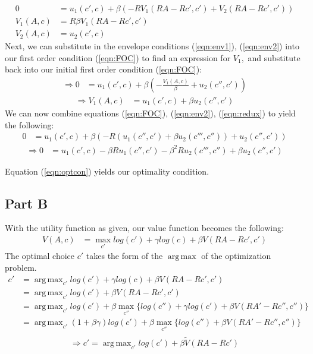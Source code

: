\documentclass[11pt]{article} %
\DeclareMathOperator*{\argmax}{arg\,max}
\begin{document}
\begin{align}
0&= u_1(c',c) + \beta (-RV_1(RA-Rc',c') + V_2(RA-Rc',c')) \label{eqn:FOC} \\
V_1(A,c) &= R\beta V_1(RA-Rc',c') \label{eqn:env1} \\
V_2(A,c) &= u_2(c',c) \label{eqn:env2}
\end{align}
Next, we can substitute in the envelope conditions (\ref{eqn:env1}), (\ref{eqn:env2}) into our first order condition (\ref{eqn:FOC}) to find an expression for $V_1,$ and substitute back into our initial first order condition (\ref{eqn:FOC}):
\begin{align*}
\Rightarrow 0 &= u_1(c',c) + \beta \left( -\frac{V_1(A,c)}{\beta} + u_2(c'',c')\right)
\end{align*}
\begin{align}
\Rightarrow V_1(A,c) &= u_1(c',c) + \beta u_2(c'',c') \label{eqn:redux}
\end{align}
We can now combine equations (\ref{eqn:FOC}), (\ref{eqn:env2}), (\ref{eqn:redux}) to yield the following:
\begin{align*}
 0&= u_1(c',c) + \beta(-R(u_1(c'',c') + \beta u_2(c''',c'')) + u_2(c'',c'))
\end{align*}
\begin{align}
\Rightarrow 0&= u_1(c',c) - \beta R u_1(c'',c') - \beta^2 R u_2(c''',c'') + \beta u_2(c'',c') \label{eqn:optcon}
\end{align}

Equation (\ref{eqn:optcon}) yields our optimality condition.

\subsection{Part B}
With the utility function as given, our value function becomes the following:
\begin{align*}
V(A,c) &= \max_{c'} log(c') + \gamma log(c) + \beta V(RA-Rc',c')
\end{align*}
The optimal choice $c'$ takes the form of the $\argmax$ of the optimization problem. 
\begin{align*}
c' &= \argmax_{c'}  log(c') + \gamma log(c) + \beta V(RA-Rc',c')\\
&= \argmax_{c'}  log(c') + \beta V(RA-Rc',c')\\
&=  \argmax_{c'}  log(c') + \beta \max_{c''}\{ log(c'') + \gamma log(c')  + \beta V(RA'-Rc'',c'')\} \\
&= \argmax_{c'}  (1+\beta \gamma) log(c') + \beta \max_{c''}\{ log(c'')   + \beta V(RA'-Rc'',c'')\} \\
\end{align*}
\begin{equation}
\Rightarrow c' = \argmax_{c'}   log(c') + \beta \tilde{V}(RA-Rc') \label{eqn:vtilde}
\end{equation}
\end{document}
